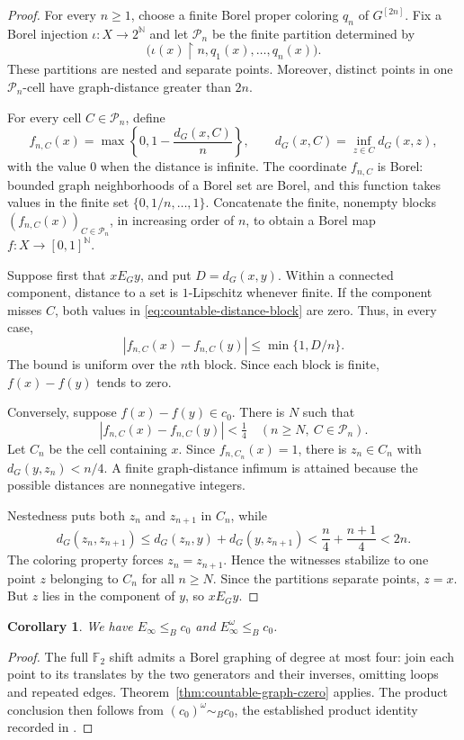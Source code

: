 \documentclass[11pt]{article}
\numberwithin{equation}{section}
\newtheorem{corollary}[theorem]{Corollary}
\theoremstyle{definition}
\newcommand{\N}{\mathbb N}
\begin{document}
\begin{proof}
For every $n\geq1$, choose a finite Borel proper coloring $q_n$ of
$G^{[2n]}$. Fix a Borel injection $\iota:X\to 2^{\N}$ and let
$\mathcal P_n$ be the finite partition determined by
\[
 \bigl(\iota(x)\mathbin{\upharpoonright}n,q_1(x),\ldots,q_n(x)\bigr).
\]
These partitions are nested and separate points. Moreover, distinct
points in one $\mathcal P_n$-cell have graph-distance greater than $2n$.

For every cell $C\in\mathcal P_n$, define
\begin{equation}\label{eq:countable-distance-block}
 f_{n,C}(x)=\max\left\{0,1-\frac{d_G(x,C)}{n}\right\},
 \qquad d_G(x,C)=\inf_{z\in C}d_G(x,z),
\end{equation}
with the value $0$ when the distance is infinite. The coordinate
$f_{n,C}$ is Borel: bounded graph neighborhoods of a Borel set are Borel,
and this function takes values in the finite set
$\{0,1/n,\ldots,1\}$. Concatenate the finite, nonempty blocks
$(f_{n,C}(x))_{C\in\mathcal P_n}$, in increasing order of $n$, to obtain
a Borel map $f:X\to[0,1]^{\N}$.

Suppose first that $x\mathrel{E_G}y$, and put $D=d_G(x,y)$. Within a
connected component, distance to a set is $1$-Lipschitz whenever finite.
If the component misses $C$, both values in
\eqref{eq:countable-distance-block} are zero. Thus, in every case,
\[
 |f_{n,C}(x)-f_{n,C}(y)|\leq\min\{1,D/n\}.
\]
The bound is uniform over the $n$th block. Since each block is finite,
$f(x)-f(y)$ tends to zero.

Conversely, suppose $f(x)-f(y)\in c_0$. There is $N$ such that
\[
 |f_{n,C}(x)-f_{n,C}(y)|<\tfrac14
 \quad(n\geq N,\ C\in\mathcal P_n).
\]
Let $C_n$ be the cell containing $x$. Since $f_{n,C_n}(x)=1$, there is
$z_n\in C_n$ with $d_G(y,z_n)<n/4$. A finite graph-distance infimum is
attained because the possible distances are nonnegative integers.

Nestedness puts both $z_n$ and $z_{n+1}$ in $C_n$, while
\[
 d_G(z_n,z_{n+1})
 \leq d_G(z_n,y)+d_G(y,z_{n+1})
 <\frac n4+\frac{n+1}{4}<2n.
\]
The coloring property forces $z_n=z_{n+1}$. Hence the witnesses stabilize
to one point $z$ belonging to $C_n$ for all $n\geq N$. Since the
partitions separate points, $z=x$. But $z$ lies in the component of $y$,
so $x\mathrel{E_G}y$.
\end{proof}


\begin{corollary}\label{thm:countable-czero-comparisons}
We have $E_\infty\le_B c_0$ and $E_\infty^\omega\le_B c_0$.
\end{corollary}
\begin{proof}
The full $\mathbb F_2$ shift admits a Borel graphing of degree at most
four: join each point to its translates by the two generators and
their inverses, omitting loops and repeated edges.
Theorem~\ref{thm:countable-graph-czero} applies.
The product conclusion then follows from
$(c_0)^\omega\sim_B c_0$, the established product identity
recorded in \cite[Lemma~7.3]{GaoBanach}.
\end{proof}
\end{document}
